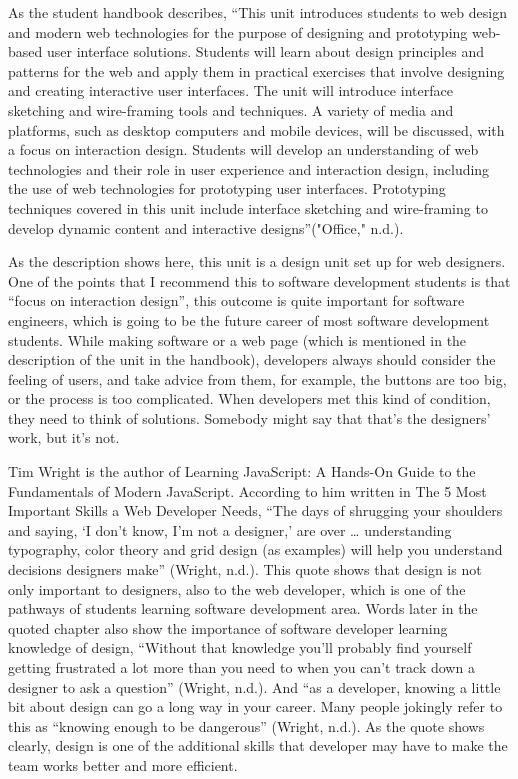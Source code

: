\documentclass[12pt]{article}
\begin{document}
As the student handbook describes, “This unit introduces students to web design and modern web technologies for the purpose of designing and prototyping web-based user interface solutions. Students will learn about design principles and patterns for the web and apply them in practical exercises that involve designing and creating interactive user interfaces. The unit will introduce interface sketching and wire-framing tools and techniques. A variety of media and platforms, such as desktop computers and mobile devices, will be discussed, with a focus on interaction design. Students will develop an understanding of web technologies and their role in user experience and interaction design, including the use of web technologies for prototyping user interfaces. Prototyping techniques covered in this unit include interface sketching and wire-framing to develop dynamic content and interactive designs”("Office," n.d.).

As the description shows here, this unit is a design unit set up for web designers. One of the points that I recommend this to software development students is that “focus on interaction design”, this outcome is quite important for software engineers, which is going to be the future career of most software development students. While making software or a web page (which is mentioned in the description of the unit in the handbook), developers always should consider the feeling of users, and take advice from them, for example, the buttons are too big, or the process is too complicated. When developers met this kind of condition, they need to think of solutions. Somebody might say that that’s the designers’ work, but it’s not.

Tim Wright is the author of Learning JavaScript: A Hands-On Guide to the Fundamentals of Modern JavaScript. According to him written in The 5 Most Important Skills a Web Developer Needs, “The days of shrugging your shoulders and saying, ‘I don’t know, I’m not a designer,’ are over … understanding typography, color theory and grid design (as examples) will help you understand decisions designers make” (Wright, n.d.). This quote shows that design is not only important to designers, also to the web developer, which is one of the pathways of students learning software development area. Words later in the quoted chapter also show the importance of software developer learning knowledge of design, “Without that knowledge you’ll probably find yourself getting frustrated a lot more than you need to when you can’t track down a designer to ask a question”  (Wright, n.d.). And “as a developer, knowing a little bit about design can go a long way in your career. Many people jokingly refer to this as “knowing enough to be dangerous”  (Wright, n.d.). As the quote shows clearly, design is one of the additional skills that developer may have to make the team works better and more efficient.
\end{document}
